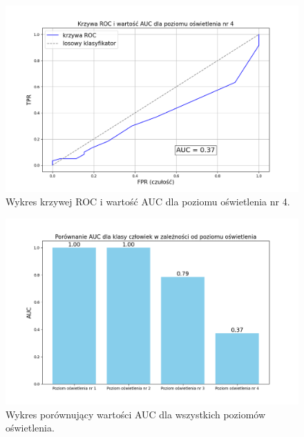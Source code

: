 \begin{figure}[H]
    \centering
    \includegraphics[width=\linewidth]{r_test_dokładności/AUC_charts/4.png}
    \caption{Wykres krzywej ROC i wartość AUC dla poziomu oświetlenia nr 4.}
    \label{fig:ROC-4}
\end{figure}

\begin{figure}[H]
    \centering
    \includegraphics[width=\linewidth]{r_test_dokładności/AUC_charts/porownanieAUC.png}
    \caption{Wykres porównujący wartości AUC dla wszystkich poziomów oświetlenia.}
    \label{fig:AUC}
\end{figure}

